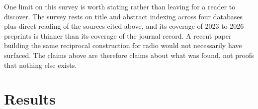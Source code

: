 \documentclass[journal]{IEEEtran}
\begin{document}
One limit on this survey is worth stating rather than leaving for a reader to
discover. The survey rests on title and abstract indexing across four databases
plus direct reading of the sources cited above, and its coverage of 2023 to 2026
preprints is thinner than its coverage of the journal record. A recent paper
building the same reciprocal construction for radio would not necessarily have
surfaced. The claims above are therefore claims about what was found, not
proofs that nothing else exists.




%
%
%
%
%

\section{Results}
\label{sec:results}
\end{document}

